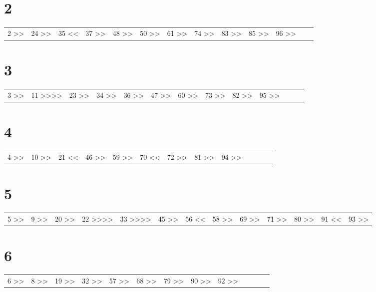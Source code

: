 \documentclass[11pt]{article}
\begin{document}
\section{2}
\label{sec-4}
\begin{center}
\begin{tabular}{lllllllllllll}
2 >> & 24 >> & 35 << & 37 >> & 48 >> & 50 >> & 61 >> & 74 >> & 83 >> & 85 >> & 96 >> &  & \\
\end{tabular}
\end{center}
\section{3}
\label{sec-5}
\begin{center}
\begin{tabular}{lllllllllllll}
3 >> & 11 >>>> & 23 >> & 34 >> & 36 >> & 47 >> & 60 >> & 73 >> & 82 >> & 95 >> &  &  & \\
\end{tabular}
\end{center}
\section{4}
\label{sec-6}
\begin{center}
\begin{tabular}{lllllllllllll}
4 >> & 10 >> & 21 << & 46 >> & 59 >> & 70 << & 72 >> & 81 >> & 94 >> &  &  &  & \\
\end{tabular}
\end{center}
\section{5}
\label{sec-7}
\begin{center}
\begin{tabular}{lllllllllllll}
5 >> & 9 >> & 20 >> & 22 >>>> & 33 >>>> & 45 >> & 56 << & 58 >> & 69 >> & 71 >> & 80 >> & 91 << & 93 >>\\
\end{tabular}
\end{center}
\section{6}
\label{sec-8}
\begin{center}
\begin{tabular}{lllllllllllll}
6 >> & 8 >> & 19 >> & 32 >> & 57 >> & 68 >> & 79 >> & 90 >> & 92 >> &  &  &  & \\
\end{tabular}
\end{center}
\end{document}
